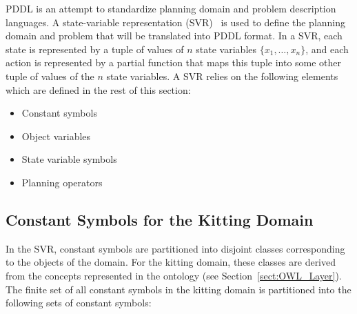 PDDL is an attempt to standardize planning domain and problem description languages. A state-variable representation (SVR)~\cite{NAU.2004} is used to define the planning domain and problem that will be translated into PDDL format. In a SVR, each state is represented by a tuple of values of $n$ state variables $\lbrace x_1,\dots,x_n\rbrace$, and each action is represented by a partial function that maps this tuple into some other tuple of values of the $n$ state variables. A SVR relies on the following elements which are defined in the rest of this section:
\begin{itemize}
  \item Constant symbols
  \item Object variables
  \item State variable symbols
  \item Planning operators
\end{itemize}

\subsection{Constant Symbols for the Kitting Domain}
In the SVR, constant symbols are partitioned into disjoint classes corresponding to the objects of the domain. For the kitting domain, these classes are derived from the concepts represented in the ontology (see Section~\ref{sect:OWL_Layer}). The finite set of all constant symbols in the kitting domain is partitioned into the following sets of constant symbols:

